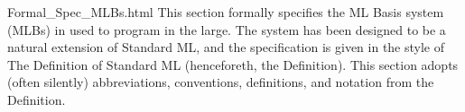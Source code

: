

\newcommand{\mbb}[1]{\mathbb{#1}}
\newcommand{\mbf}[1]{\mathbf{#1}}
\renewcommand{\mit}[1]{\mathit{#1}}
\newcommand{\mrm}[1]{\mathrm{#1}}
\newcommand{\mtt}[1]{\mathtt{#1}}
\newcommand{\mcal}[1]{\mathcal{#1}}
\newcommand{\msf}[1]{\mathsf{#1}}

\newcommand{\ttt}[1]{\texttt{#1}}

\newenvironment{stackAux}[2]{%
\setlength{\arraycolsep}{0pt}
\begin{array}[#1]{#2}}{
\end{array}}
\newenvironment{stackCC}{
\begin{stackAux}{c}{c}}{\end{stackAux}}
\newenvironment{stackCL}{
\begin{stackAux}{c}{l}}{\end{stackAux}}
\newenvironment{stackTL}{
\begin{stackAux}{t}{l}}{\end{stackAux}}
\newenvironment{stackTR}{
\begin{stackAux}{t}{r}}{\end{stackAux}}
\newenvironment{stackBC}{
\begin{stackAux}{b}{c}}{\end{stackAux}}
\newenvironment{stackBL}{
\begin{stackAux}{b}{l}}{\end{stackAux}}

\newcommand{\stagger}[2]{%
\begin{array}{ccc}%
\multicolumn{2}{l}{#1}&\\%
&\multicolumn{2}{r}{#2}%
\end{array}}

\newcommand{\axiom}[1]{{\displaystyle\strut{#1}}}
\newcommand{\infrule}[2]{{\frac{\displaystyle\strut{#1}}{\displaystyle\strut{#2}}}} 
\newcommand{\judge}[2]{\infrule{#1}{#2}}


{}
    {Formal_Spec_MLBs.html}
%
This section formally specifies the ML Basis system (MLBs) in {\mlton} used
to program in the large.  The system has been designed to be a natural
extension of Standard ML, and the specification is given in the style
of The Definition of Standard ML (henceforeth, the Definition).  This
section adopts (often silently) abbreviations, conventions,
definitions, and notation from the Definition.
%
